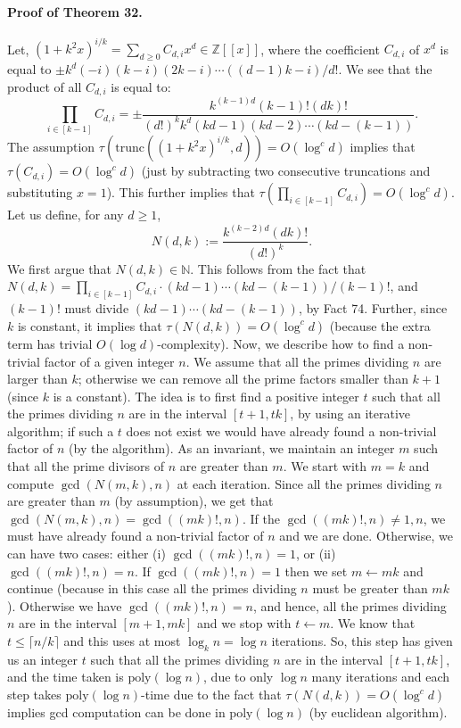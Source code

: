 \documentclass[10pt,a4paper]{article}
\begin{document}
\paragraph{Proof of Theorem 32.} Let, $(1+k^2x)^{i/k}=\sum_{d\ge0}C_{d,i}x^d\in\mathbb Z[[x]]$, where the coefficient $C_{d,i}$ of $x^d$ is equal to $\pm k^d(-i)(k-i)(2k-i)\cdots((d-1)k-i)/d!$. We see that the product of all $C_{d,i}$ is equal to:
\[\prod_{i\in[k-1]}C_{d,i}=\pm\frac{k^{(k-1)d}(k-1)!(dk)!}{(d!)^kk^d(kd-1)(kd-2)\cdots(kd-(k-1))}.\]
The assumption $\tau(\mathrm{trunc}((1+k^2x)^{i/k},d))=O(\log^cd)$ implies that $\tau(C_{d,i})=O(\log^cd)$ (just by subtracting two consecutive truncations and substituting $x=1$). This further implies that $\tau(\prod_{i\in[k-1]}C_{d,i})=O(\log^cd)$. Let us define, for any $d\ge1$,
\[N(d,k):=\frac{k^{(k-2)d}(dk)!}{(d!)^k}.\]
We first argue that $N(d,k)\in\mathbb N$. This follows from the fact that $N(d,k)=\prod_{i\in[k-1]}C_{d,i}\cdot(kd-1)\cdots(kd-(k-1))/(k-1)!$, and $(k-1)!$ must divide $(kd-1)\cdots(kd-(k-1))$, by Fact 74. Further, since $k$ is constant, it implies that $\tau(N(d,k))=O(\log^cd)$ (because the extra term has trivial $O(\log d)$-complexity).
Now, we describe how to find a non-trivial factor of a given integer $n$. We assume that all the primes dividing $n$ are larger than $k$; otherwise we can remove all the prime factors smaller than $k+1$ (since $k$ is a constant).
The idea is to first find a positive integer $t$ such that all the primes dividing $n$ are in the interval $[t+1,tk]$, by using an iterative algorithm; if such a $t$ does not exist we would have already found a non-trivial factor of $n$ (by the algorithm). As an invariant, we maintain an integer $m$ such that all the prime divisors of $n$ are greater than $m$. We start with $m=k$ and compute $\gcd(N(m,k),n)$ at each iteration. Since all the primes dividing $n$ are greater than $m$ (by assumption), we get that $\gcd(N(m,k),n)=\gcd((mk)!,n)$. If the $\gcd((mk)!,n)\ne1,n$, we must have already found a non-trivial factor of $n$ and we are done. Otherwise, we can have two cases: either (i) $\gcd((mk)!,n)=1$, or (ii) $\gcd((mk)!,n)=n$.
If $\gcd((mk)!,n)=1$ then we set $m\leftarrow mk$ and continue (because in this case all the primes dividing $n$ must be greater than $mk$). Otherwise we have $\gcd((mk)!,n)=n$, and hence, all the primes dividing $n$ are in the interval $[m+1,mk]$ and we stop with $t\leftarrow m$. We know that $t\le\lceil n/k\rceil$ and this uses at most $\log_kn=\log n$ iterations. So, this step has given us an integer $t$ such that all the primes dividing $n$ are in the interval $[t+1,tk]$, and the time taken is $\mathrm{poly}(\log n)$, due to only $\log n$ many iterations and each step takes $\mathrm{poly}(\log n)$-time due to the fact that $\tau(N(d,k))=O(\log^cd)$ implies gcd computation can be done in $\mathrm{poly}(\log n)$ (by euclidean algorithm).
\end{document}
